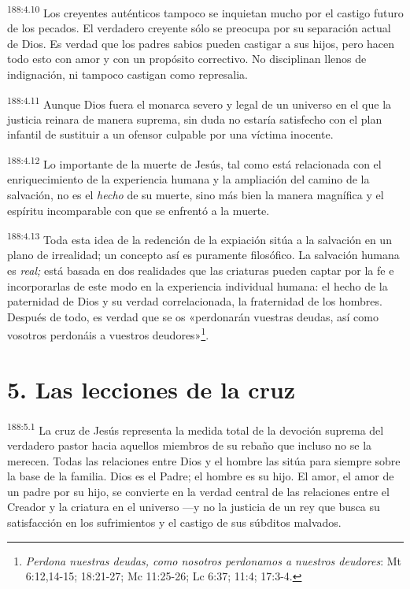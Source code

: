 \par
\textsuperscript{188:4.10} Los creyentes auténticos tampoco se inquietan mucho por el castigo futuro de los pecados. El verdadero creyente sólo se preocupa por su separación actual de Dios. Es verdad que los padres sabios pueden castigar a sus hijos, pero hacen todo esto con amor y con un propósito correctivo. No disciplinan llenos de indignación, ni tampoco castigan como represalia.

\par
\textsuperscript{188:4.11} Aunque Dios fuera el monarca severo y legal de un universo en el que la justicia reinara de manera suprema, sin duda no estaría satisfecho con el plan infantil de sustituir a un ofensor culpable por una víctima inocente.

\par
\textsuperscript{188:4.12} Lo importante de la muerte de Jesús, tal como está relacionada con el enriquecimiento de la experiencia humana y la ampliación del camino de la salvación, no es el \textit{hecho} de su muerte, sino más bien la manera magnífica y el espíritu incomparable con que se enfrentó a la muerte.

\par
\textsuperscript{188:4.13} Toda esta idea de la redención de la expiación sitúa a la salvación en un plano de irrealidad; un concepto así es puramente filosófico. La salvación humana es \textit{real;} está basada en dos realidades que las criaturas pueden captar por la fe e incorporarlas de este modo en la experiencia individual humana: el hecho de la paternidad de Dios y su verdad correlacionada, la fraternidad de los hombres. Después de todo, es verdad que se os «perdonarán vuestras deudas, así como vosotros perdonáis a vuestros deudores»\footnote{\textit{Perdona nuestras deudas, como nosotros perdonamos a nuestros deudores}: Mt 6:12,14-15; 18:21-27; Mc 11:25-26; Lc 6:37; 11:4; 17:3-4.}.

\section*{5. Las lecciones de la cruz}
\par
\textsuperscript{188:5.1} La cruz de Jesús representa la medida total de la devoción suprema del verdadero pastor hacia aquellos miembros de su rebaño que incluso no se la merecen. Todas las relaciones entre Dios y el hombre las sitúa para siempre sobre la base de la familia. Dios es el Padre; el hombre es su hijo. El amor, el amor de un padre por su hijo, se convierte en la verdad central de las relaciones entre el Creador y la criatura en el universo ---y no la justicia de un rey que busca su satisfacción en los sufrimientos y el castigo de sus súbditos malvados.

